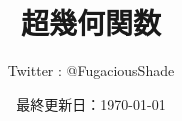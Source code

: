 \documentclass[a4paper]{ltjsarticle} %
\title{超幾何関数}
\author{Twitter : @FugaciousShade}
\date{最終更新日：\today}
\begin{document}
\maketitle
\tableofcontents





\appendix
\def\thesection{\Alph{section}}










\end{document}
